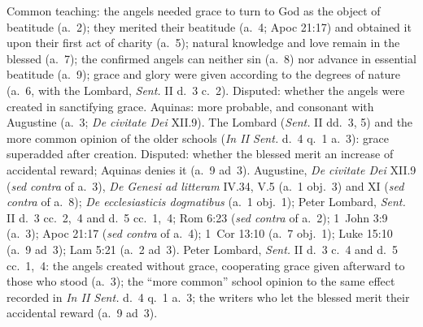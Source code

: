  {Common teaching: the angels needed grace to turn to God as the object
 of beatitude (a.~2); they merited their beatitude (a.~4; Apoc 21:17)
 and obtained it upon their first act of charity (a.~5); natural
 knowledge and love remain in the blessed (a.~7); the confirmed angels
 can neither sin (a.~8) nor advance in essential beatitude (a.~9);
 grace and glory were given according to the degrees of nature (a.~6,
 with the Lombard, \emph{Sent.} II d.~3 c.~2). Disputed: whether the
 angels were created in sanctifying grace. Aquinas: more probable, and
 consonant with Augustine (a.~3; \emph{De civitate Dei} XII.9). The
 Lombard (\emph{Sent.} II dd.~3, 5) and the more common opinion of the
 older schools (\emph{In II Sent.} d.~4 q.~1 a.~3): grace superadded
 after creation. Disputed: whether the blessed merit an increase of
 accidental reward; Aquinas denies it (a.~9 ad~3).}
 {Augustine, \emph{De civitate Dei} XII.9 (\emph{sed contra} of a.~3),
 \emph{De Genesi ad litteram} IV.34, V.5 (a.~1 obj.~3) and XI
 (\emph{sed contra} of a.~8); \emph{De ecclesiasticis dogmatibus} (a.~1
 obj.~1); Peter Lombard, \emph{Sent.} II d.~3 cc.~2,~4 and d.~5
 cc.~1,~4; Rom 6:23 (\emph{sed contra} of a.~2); 1~John 3:9
 (a.~3); Apoc 21:17 (\emph{sed contra} of a.~4); 1~Cor 13:10 (a.~7
 obj.~1); Luke 15:10 (a.~9 ad~3); Lam 5:21 (a.~2 ad~3).}
 {Peter Lombard, \emph{Sent.} II d.~3 c.~4 and d.~5 cc.~1,~4: the angels
 created without grace, cooperating grace given afterward to those who
 stood (a.~3); the ``more common'' school opinion to the same effect
 recorded in \emph{In II Sent.} d.~4 q.~1 a.~3; the writers who let the
 blessed merit their accidental reward (a.~9 ad~3).}
